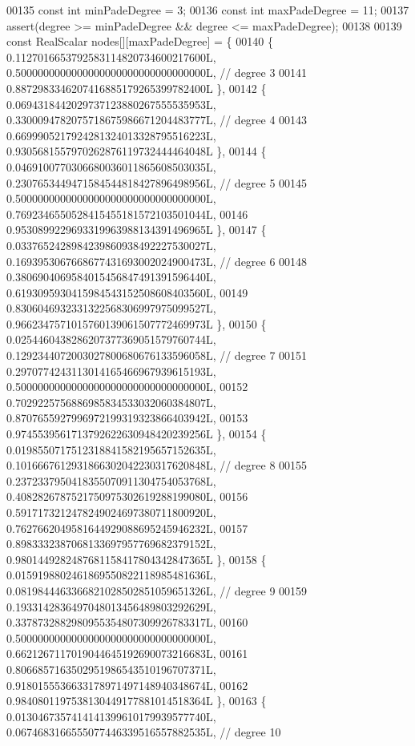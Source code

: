 \begin{DoxyCode}
00135   \textcolor{keyword}{const} \textcolor{keywordtype}{int} minPadeDegree = 3;
00136   \textcolor{keyword}{const} \textcolor{keywordtype}{int} maxPadeDegree = 11;
00137   assert(degree >= minPadeDegree && degree <= maxPadeDegree);
00138 
00139   \textcolor{keyword}{const} RealScalar nodes[][maxPadeDegree] = \{ 
00140     \{ 0.1127016653792583114820734600217600L, 0.5000000000000000000000000000000000L,  \textcolor{comment}{// degree 3}
00141       0.8872983346207416885179265399782400L \}, 
00142     \{ 0.0694318442029737123880267555535953L, 0.3300094782075718675986671204483777L,  \textcolor{comment}{// degree 4}
00143       0.6699905217924281324013328795516223L, 0.9305681557970262876119732444464048L \},
00144     \{ 0.0469100770306680036011865608503035L, 0.2307653449471584544818427896498956L,  \textcolor{comment}{// degree 5}
00145       0.5000000000000000000000000000000000L, 0.7692346550528415455181572103501044L,
00146       0.9530899229693319963988134391496965L \},
00147     \{ 0.0337652428984239860938492227530027L, 0.1693953067668677431693002024900473L,  \textcolor{comment}{// degree 6}
00148       0.3806904069584015456847491391596440L, 0.6193095930415984543152508608403560L,
00149       0.8306046932331322568306997975099527L, 0.9662347571015760139061507772469973L \},
00150     \{ 0.0254460438286207377369051579760744L, 0.1292344072003027800680676133596058L,  \textcolor{comment}{// degree 7}
00151       0.2970774243113014165466967939615193L, 0.5000000000000000000000000000000000L,
00152       0.7029225756886985834533032060384807L, 0.8707655927996972199319323866403942L,
00153       0.9745539561713792622630948420239256L \},
00154     \{ 0.0198550717512318841582195657152635L, 0.1016667612931866302042230317620848L,  \textcolor{comment}{// degree 8}
00155       0.2372337950418355070911304754053768L, 0.4082826787521750975302619288199080L,
00156       0.5917173212478249024697380711800920L, 0.7627662049581644929088695245946232L,
00157       0.8983332387068133697957769682379152L, 0.9801449282487681158417804342847365L \},
00158     \{ 0.0159198802461869550822118985481636L, 0.0819844463366821028502851059651326L,  \textcolor{comment}{// degree 9}
00159       0.1933142836497048013456489803292629L, 0.3378732882980955354807309926783317L,
00160       0.5000000000000000000000000000000000L, 0.6621267117019044645192690073216683L,
00161       0.8066857163502951986543510196707371L, 0.9180155536633178971497148940348674L,
00162       0.9840801197538130449177881014518364L \},
00163     \{ 0.0130467357414141399610179939577740L, 0.0674683166555077446339516557882535L,  \textcolor{comment}{// degree 10}

\end{DoxyCode}
